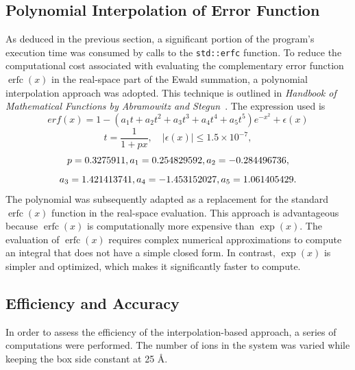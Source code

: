 \subsection{Polynomial Interpolation of Error Function}
As deduced in the previous section, a significant portion of the program’s execution time was consumed by calls to the \verb|std::erfc| function. To reduce the computational cost associated with evaluating the complementary error function \(\operatorname{erfc}(x)\) in the real-space part of the Ewald summation, a polynomial interpolation approach was adopted. This technique is outlined in \textit{Handbook of Mathematical Functions by Abramowitz and Stegun}~\cite{abramowitz1965handbook}. The expression used is
\begin{equation}  
    erf(x) = 1 - (a_1 t + a_2 t^2 + a_3 t^3 + a_4 t^4 + a_5 t^5) e^{-x^2} + \epsilon(x)
\end{equation}
\[
    t = \frac{1}{1 + px}, \quad |\epsilon(x)| \leq 1.5 \times 10^{-7},
\]
\[
p = 0.3275911, \\
a_1 = 0.254829592, \\
a_2 = -0.284496736,
\]
\[
a_3 = 1.421413741, \\
a_4 = -1.453152027, \\
a_5 = 1.061405429.
\]
The polynomial was subsequently adapted as a replacement for the standard $\operatorname{erfc}(x)$ function in the real-space evaluation. This approach is advantageous because $\operatorname{erfc}(x)$ is computationally more expensive than $\operatorname{exp}(x)$. The evaluation of $\operatorname{erfc}(x)$ requires complex numerical approximations to compute an integral that does not have a simple closed form. In contrast, $\operatorname{exp}(x)$ is simpler and optimized, which makes it significantly faster to compute.

\subsection{Efficiency and Accuracy}
In order to assess the efficiency of the interpolation-based approach, a series of computations were performed. The number of ions in the system was varied while keeping the box side constant at 25 \AA. 

